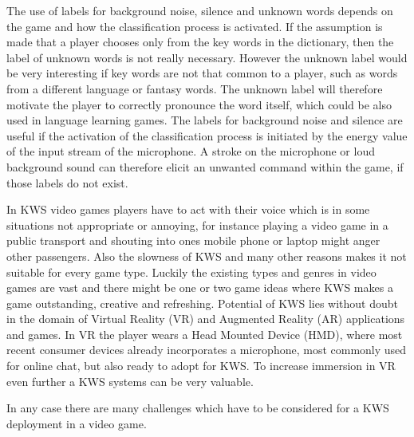 The use of labels for background noise, silence and unknown words depends on the game and how the classification process is activated.
If the assumption is made that a player chooses only from the key words in the dictionary, then the label of unknown words is not really necessary.
However the unknown label would be very interesting if key words are not that common to a player, such as words from a different language or fantasy words.
The unknown label will therefore motivate the player to correctly pronounce the word itself, which could be also used in language learning games.
The labels for background noise and silence are useful if the activation of the classification process is initiated by the energy value of the input stream of the microphone.
A stroke on the microphone or loud background sound can therefore elicit an unwanted command within the game, if those labels do not exist.

In KWS video games players have to act with their voice which is in some situations not appropriate or annoying, for instance playing a video game in a public transport and shouting into ones mobile phone or laptop might anger other passengers.
Also the slowness of KWS and many other reasons makes it not suitable for every game type.
Luckily the existing types and genres in video games are vast and there might be one or two game ideas where KWS makes a game outstanding, creative and refreshing.
Potential of KWS lies without doubt in the domain of Virtual Reality (VR) and Augmented Reality (AR) applications and games.
In VR the player wears a Head Mounted Device (HMD), where most recent consumer devices already incorporates a microphone, most commonly used for online chat, but also ready to adopt for KWS.
To increase immersion in VR even further a KWS systems can be very valuable.

In any case there are many challenges which have to be considered for a KWS deployment in a video game.


